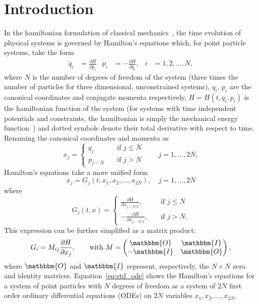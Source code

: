 \documentclass{iopart}
\newcommand{\pd}[2]{\frac{\partial#1}{\partial#2}}
\begin{document}
\section{Introduction}
In the hamiltonian formulation of classical mechanics~\cite{gol:1980, fw:2003},
the time evolution of physical systems is governed by Hamilton's equations
which, for point particle systems, take the form
\begin{align}\label{eq:heqs}
  \dot q_i&=\pd{H}{p_i}&
  \dot p_i&=-\pd{H}{q_i},&
  i&=1, 2, \ldots, N,
\end{align}
where $N$ is the number of degrees of freedom of the system (three times the
number of particles for three dimensional, unconstrained systems), $q_i$, $p_i$
are the canonical coordinates and conjugate momenta respectively, $H=H(t, q_i,
p_i)$ is the hamiltonian function of the system (for systems with time
independent potentials and constraints, the hamiltonian is simply the
mechanical energy function~\cite{fw:2003}) and dotted symbols denote their
total derivative with respect to time. 
Renaming the canonical coordinates and momenta as
\begin{equation}
  x_j = 
  \begin{cases}
    q_j&\quad\text{if }j\leq N\\
    p_{j-N}&\quad\text{if }j> N
  \end{cases}
  \qquad j=1, \ldots, 2N,
\end{equation}
Hamilton's equations take a more unified form
\begin{equation}\label{eq:std_ode}
  \dot x_j=G_j(t, x_1, x_2, \ldots, x_{2N}),\quad j=1, \ldots, 2N
\end{equation}
where
\begin{equation}
  G_j(t, x)=
  \begin{cases}\displaystyle
    \pd{H}{x_{j+N/2}} ,&\quad\text{if }j\leq N\\[1em]
    \displaystyle
    -\pd{H}{x_{j-N/2}}, &\quad\text{if }j> N.
  \end{cases}
\end{equation}
This expression can be further simplified as a matrix product:
\begin{equation}\label{eq:rhsmf}
  G_i=M_{i j}\pd{H}{x_j},\qquad
  \text{with }
  M=
  \begin{pmatrix}
    \mathbbm{O}&\mathbbm{I}\\
    -\mathbbm{I}&\mathbbm{O}
  \end{pmatrix},
\end{equation}
where $\mathbbm{O}$ and $\mathbbm{I}$ represent, respectively, the $N\times N$
zero and identity matrices.  Equation~\eqref{eq:std_ode} shows the Hamilton's
equations for a system of point particles with $N$ degrees of freedom as a
system of $2N$ first order ordinary differential equations (ODEs) on $2N$
variables $x_1, x_2, \ldots, x_{2N}$.
\end{document}
